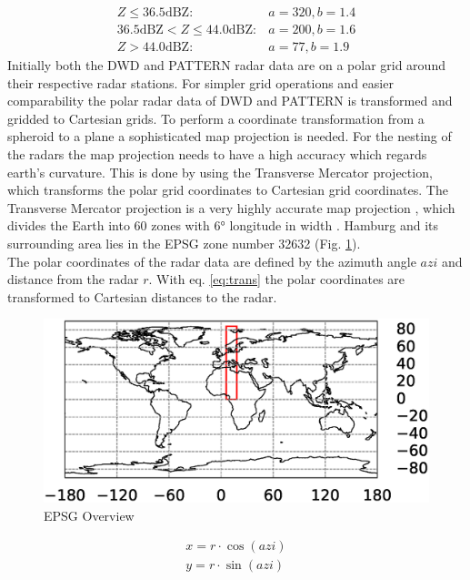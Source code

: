 \documentclass[11pt,twoside,a4paper,fleqn,x11names]{report}
\numberwithin{equation}{chapter}
\numberwithin{figure}{chapter}
\numberwithin{table}{chapter}
\begin{document}
\begin{equation}
\begin{array}{lcl}
Z \le 36.5 \text{dBZ}: & a = 320, b = 1.4 \\
36.5 \text{dBZ} < Z \le 44.0 \text{dBZ}: & a  = 200, b = 1.6 \\
Z > 44.0 \text{dBZ}: & a = 77, b = 1.9
\end{array}
\end{equation}
Initially both the DWD and PATTERN radar data are on a polar grid around their respective radar stations. For simpler grid operations and easier comparability the polar radar data of DWD and PATTERN is transformed and gridded to Cartesian grids. To perform a coordinate transformation from a spheroid to a plane a sophisticated map projection is needed. For the nesting of the radars the map projection needs to have a high accuracy which regards earth's curvature. This is done by using the Transverse Mercator projection, which transforms the polar grid coordinates to Cartesian grid coordinates. The Transverse Mercator projection is a very highly accurate map projection \citep{Karney2011}, which divides the Earth into 60 zones with 6° longitude in width \citep{TMP}. Hamburg and its surrounding area lies in the EPSG zone number 32632 (Fig. \ref{fig:EPSG}).\\%
The polar coordinates of the radar data are defined by the azimuth angle $azi$ and distance from the radar $r$. With eq. \ref{eq:trans} the polar coordinates are transformed to Cartesian distances to the radar.
\begin{figure}
	\centering
	\includegraphics[width=\textwidth]{EPSG2.eps}
	\caption{EPSG Overview}
	\label{fig:EPSG}
\end{figure}
\begin{equation}
	\begin{array}{lcl}
		x = r \cdot \cos(azi)\\
		y = r \cdot \sin(azi)
	\end{array}	
	\label{eq:trans}
\end{equation}%
\end{document}

